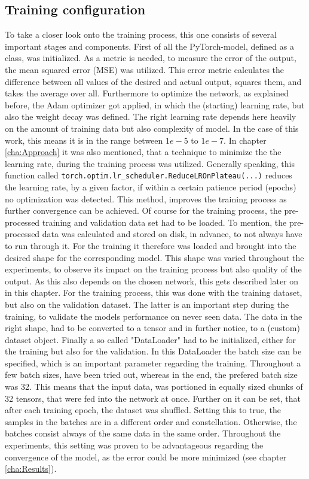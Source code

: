\subsection{Training configuration}
To take a closer look onto the training process, this one consists of several important stages and components. First of all the PyTorch-model, defined as a class, was initialized. As a metric is needed, to measure the error of the output, the mean squared error (MSE) was utilized. This error metric calculates the difference between all values of the desired and actual output, squares them, and takes the average over all. Furthermore to optimize the network, as explained before, the Adam optimizer got applied, in which the (starting) learning rate, but also the weight decay was defined. The right learning rate depends here heavily on the amount of training data but also complexity of model. In the case of this work, this means it is in the range between $1e-5$ to $1e-7$. In chapter \ref{cha:Approach} it was also mentioned, that a technique to minimize the the learning rate, during the training process was utilized. Generally speaking, this function called \texttt{torch.optim.lr\_scheduler.ReduceLROnPlateau(...)} reduces the learning rate, by a given factor, if within a certain patience period (epochs) no optimization was detected. This method, improves the training process as further convergence can be achieved. Of course for the training process, the pre-processed training and validation data set had to be loaded. To mention, the pre-processed data was calculated and stored on disk, in advance, to not always have to run through it. For the training it therefore was loaded and brought into the desired shape for the corresponding model. This shape was varied throughout the experiments, to observe its impact on the training process but also quality of the output. As this also depends on the chosen network, this gets described later on in this chapter. For the training process, this was done with the training dataset, but also on the validation dataset. The latter is an important step during the training, to validate the models performance on never seen data.
The data in the right shape, had to be converted to a tensor and in further notice, to a (custom) dataset object. Finally a so called "DataLoader" had to be initialized, either for the training but also for the validation. In this DataLoader the batch size can be specified, which is an important parameter regarding the training. Throughout a few batch sizes, have been tried out, whereas in the end, the prefered batch size was 32. This means that the input data, was portioned in equally sized chunks of 32 tensors, that were fed into the network at once. Further on it can be set, that after each training epoch, the dataset was shuffled. Setting this to true, the samples in the batches are in a different order and constellation. Otherwise, the batches consist always of the same data in the same order. Throughout the experiments, this setting was proven to be advantageous regarding the convergence of the model, as the error could be more minimized (see chapter \ref{cha:Results}).

